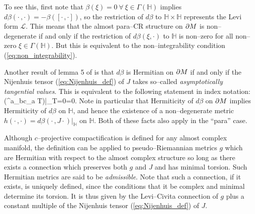 To see this, first note that $\beta(\xi)=0\ \forall\ \xi\in\Gamma( \mathbb{H} )$ implies $d\beta(\cdot\,,\cdot)=-\beta([\cdot\,,\cdot])$, so the restriction of $d\beta$ to $ \mathbb{H} \times \mathbb{H} $ represents the Levi form $\mathcal{L}$. This means that the almost para--CR structure on $\partial M$ is non--degenerate if and only if the restriction of $d\beta(\xi,\cdot)$ to $ \mathbb{H} $ is non--zero for all non--zero $\xi\in\Gamma( \mathbb{H} )$. But this is equivalent to the non--integrability condition (\ref{eq:non_integrability}).


Another result of lemma 5 of \cite{CG} is that $d\beta$ is Hermitian on $\partial M$ if and only if the Nijenhuis tensor (\ref{eq:Nijenhuis_def}) of $J$ takes so--called \textit{asymptotically tangential values}. This is equivalent to the following statement in index notation:
\be
\label{Nijenhuis_condition}
\Big({^{a}}_{bc}\nabla_a T\Big)\Big|_{T=0}=0.  \ee
Note in particular that Hermiticity of $d\beta$ on $\partial M$ implies Hermiticity of $d\beta$ on $ \mathbb{H} $, and hence the existence of a non--degenerate metric $h(\cdot\,,\cdot)=d\beta(\cdot\,,J\cdot)|_ \mathbb{H} $ on $ \mathbb{H} $. Both of these facts also apply in the ``para'' case.

Although $c$--projective compactification is defined for any almost complex manifold, the definition can be applied to pseudo--Riemannian metrics $g$ which are Hermitian with respect to the almost complex structure so long as there exists a connection which preserves both $g$ and $J$ and has minimal torsion. Such Hermitian metrics are said to be \textit{admissible}.  Note that such a connection, if it exists, is uniquely defined, since the conditions that it be complex and minimal determine its torsion. It is thus given by the Levi--Civita connection of $g$ plus a constant multiple of the Nijenhuis tensor (\ref{eq:Nijenhuis_def}) of $J$.

